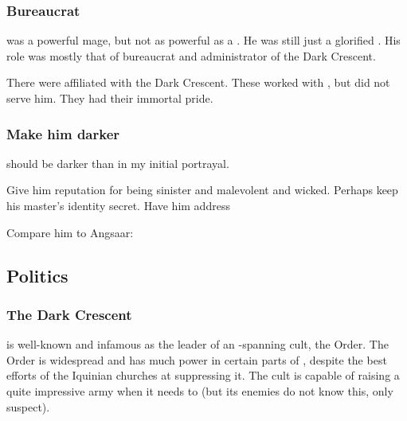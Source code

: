 \subsubsection{Bureaucrat}
\Psyrex was a powerful mage, but not as powerful as a \quiljaaran.
He was still just a glorified \scatha. 
His role was mostly that of bureaucrat and administrator of the Dark Crescent. 

There were \quiljaaran affiliated with the Dark Crescent. 
These worked with \Psyrex, but did not serve him.
They had their immortal pride. 





\subsubsection{Make him darker}
\Psyrex should be darker than in my initial portrayal.

Give him reputation for being sinister and malevolent and wicked.
Perhaps keep his master's identity secret. 
Have him address 

Compare him to Angsaar:










\subsection{Politics}
\subsubsection{The Dark Crescent}
\Psyrex{} is well-known and infamous as the leader of an \Azmith-spanning cult, the  Order. The Order is widespread and has much power in certain parts of \Velcad{}, despite the best efforts of the Iquinian churches at suppressing it. The cult is capable of raising a quite impressive army when it needs to (but its enemies do not know this, only suspect). 
























